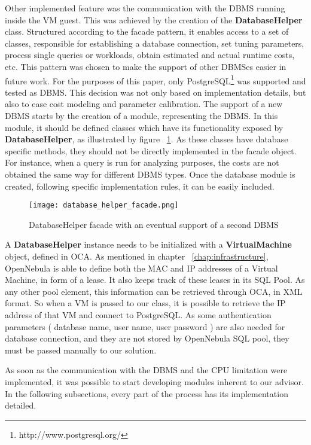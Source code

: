 Other implemented feature was the communication with the DBMS running inside the VM guest. This was achieved by the creation of the \textbf{DatabaseHelper} class. Structured according to the facade pattern, it enables access to a set of classes, responsible for establishing a database connection, set tuning parameters, process single queries or workloads, obtain estimated and actual runtime costs, etc. This pattern was chosen to make the support of other DBMSes easier in future work. For the purposes of this paper, only PostgreSQL\footnote{http://www.postgresql.org/} was supported and tested as DBMS. This decision was not only based on implementation details, but also to ease cost modeling and parameter calibration. The support of a new DBMS starts by the creation of a module, representing the DBMS. In this module,  it should be defined classes which have its functionality exposed by \textbf{DatabaseHelper}, as illustrated by figure ~\ref{fig:facade}. As these classes have database specific methods, 
they should not be 
directly implemented in the facade object. For instance, when a query is run for analyzing purposes, the costs are not obtained the same way for different DBMS types. Once the database module is created, following specific implementation rules, it can be easily included. 

\begin{figure}[ht]
  \centering
 \texttt{[image: database\_helper\_facade.png]}
  \caption{DatabaseHelper facade with an eventual support of a second DBMS}
  \label{fig:facade}
\end{figure}

A \textbf{DatabaseHelper} instance needs to be initialized with a \textbf{VirtualMachine} object, defined in OCA. As mentioned in chapter ~\ref{chap:infrastructure}, OpenNebula is able to define both the MAC and IP addresses of a Virtual Machine, in form of a lease. It also keeps track of these leases in its SQL Pool. As any other pool element, this information can be retrieved through OCA, in XML format. So when a VM is passed to our class, it is possible to retrieve the IP address of that VM and connect to PostgreSQL. As some authentication parameters ( database name, user name, user password ) are also needed for database connection, and they are not stored by OpenNebula SQL pool, they must be passed manually to our solution.

As soon as the communication with the DBMS and the CPU limitation were implemented, it was possible to start developing modules inherent to our advisor. In the following subsections, every part of the process has its implementation detailed.

